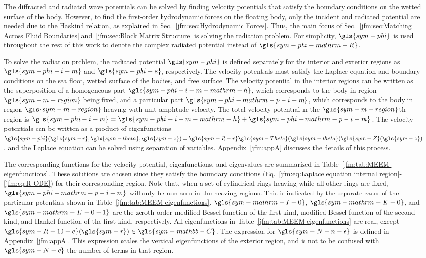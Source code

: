 \documentclass[ASNA,twocolumn]{USG} %
\begin{document}
The diffracted and radiated wave potentials can be solved by finding velocity potentials that satisfy the boundary conditions on the wetted surface of the body. 
However, to find the first-order hydrodynamic forces on the floating body, only the incident and radiated potential are needed due to the Haskind relation, as explained in Sec.~\ref{jfm:sec:Hydrodynamic Forces}. 
Thus, the main focus of Sec.~\ref{jfm:sec:Matching Across Fluid Boundaries} and~\ref{jfm:sec:Block Matrix Structure} is solving the radiation problem. 
For simplicity, $\gls{sym-phi}$ is used throughout the rest of this work 
to denote the complex radiated potential instead of $\gls{sym-phi-mathrm-R}$. 

To solve the radiation problem, the radiated potential $\gls{sym-phi}$ is defined separately 
for the interior and exterior regions as $\gls{sym-phi-i-m}$ and $\gls{sym-phi-e}$, respectively. 
The velocity potentials must satisfy the Laplace equation and boundary conditions 
on the sea floor, wetted surface of the bodies, and free surface. 
The velocity potential in the interior regions can be written as the superposition 
of a homogeneous part $\gls{sym-phi-i-m-mathrm-h}$, which corresponds to the body in region $\gls{sym-m-region}$ being fixed, 
and a particular part $\gls{sym-phi-mathrm-p-i-m}$, which corresponds to the body in region $\gls{sym-m-region}$ heaving with unit amplitude velocity. 
The total velocity potential in the $\gls{sym-m-region}$th region is 
$\gls{sym-phi-i-m}= \gls{sym-phi-i-m-mathrm-h} + \gls{sym-phi-mathrm-p-i-m}$. 
The velocity potentials can be written as a product of eigenfunctions 
$\gls{sym-phi} (\gls{sym-r}, \gls{sym-theta}, \gls{sym-z})= \gls{sym-R-r}\gls{sym-Theta}(\gls{sym-theta})\gls{sym-Z}(\gls{sym-z})$, 
and the Laplace equation can be solved using separation of variables. 
Appendix~\ref{jfm:appA} discusses the details of this process.

The corresponding functions for the velocity potential, eigenfunctions, and eigenvalues 
are summarized in Table~\ref{jfm:tab:MEEM-eigenfunctions}. 
These solutions are chosen since they satisfy the boundary conditions (Eq.~\ref{jfm:eq:Laplace equation internal region}-\ref{jfm:eq:R-ODE}) for their corresponding region. 
Note that, when \modelling{} a set of cylindrical rings heaving while all other rings are fixed, 
$\gls{sym-phi-mathrm-p-i-m}$ will only be non-zero in the heaving regions. 
This is indicated by the separate cases of the particular potentials shown in Table~\ref{jfm:tab:MEEM-eigenfunctions}. 
$\gls{sym-mathrm-I-0}$, $\gls{sym-mathrm-K-0}$, and $\gls{sym-mathrm-H-0-1}$
are the zeroth-order modified Bessel function of the first kind, modified Bessel function of the second kind, and Hankel function of the first kind, respectively. 
All eigenfunctions in Table~\ref{jfm:tab:MEEM-eigenfunctions} are real, except $\gls{sym-R-10-e}(\gls{sym-r})\in\gls{sym-mathbb-C}$.
The expression for $\gls{sym-N-n-e}$ is defined in Appendix~\ref{jfm:appA}.
This expression scales the vertical eigenfunctions of the exterior region, and is not to be confused with $\gls{sym-N-e}$ the number of terms in that region. 
\end{document}
